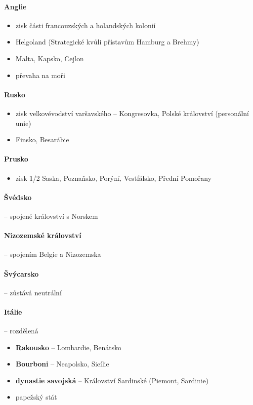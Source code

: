 \paragraph{Anglie}
	\begin{itemize}
	\item zisk  části francouzských a holandských kolonií
	\item Helgoland (Strategické kvůli přístavům Hamburg a Brehmy)
	\item Malta, Kapsko, Cejlon
	\item[\ra] převaha na moři
	\end{itemize}
	
\paragraph{Rusko}
	\begin{itemize}
	\item zisk velkovévodství varšavského -- Kongresovka, Polské království (personální unie)
	\item Finsko, Besarábie
	\end{itemize}
	
\paragraph{Prusko}
	\begin{itemize}
	\item zisk 1/2 Saska, Poznaňsko, Porýní, Vestfálsko, Přední Pomořany
	\end{itemize}
	
	
\paragraph{Švédsko} -- spojené království s Norskem

\paragraph{Nizozemské království} -- spojením Belgie a Nizozemska 

\paragraph{Švýcarsko} -- zůstává neutrální

\paragraph{Itálie} -- rozdělená
\begin{itemize}
\item \textbf{Rakousko} -- Lombardie, Benátsko
\item \textbf{Bourboni} -- Neapolsko, Sicílie
\item \textbf{dynastie savojská} -- Království Sardinské (Piemont, Sardinie)
\item papežský stát
\end{itemize}

